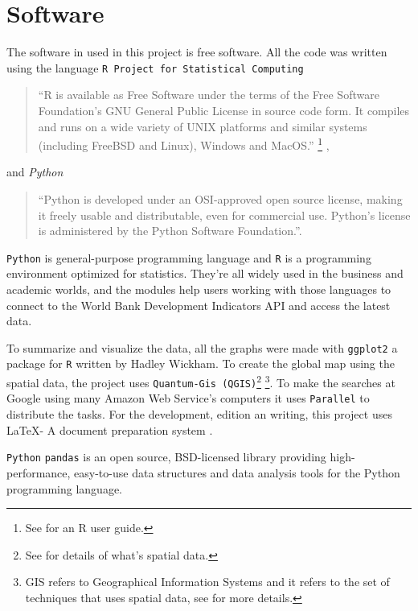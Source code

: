 \chapter{Software}
\label{chap_software}


\noindent The software in used in this project is free software. All the code was written using the  language \texttt{R Project for Statistical Computing}\begin{quote}``R is available as Free Software under the terms of the Free Software Foundation's GNU General Public License in source code form. It compiles and runs on a wide variety of UNIX platforms and similar systems (including FreeBSD and Linux), Windows and MacOS.'' \footnote{See \cite{R:Bloomfield:2014} for an R user guide.} \cite{r_pagina},\end{quote}
and \textit{Python}
\begin{quote}``Python is developed under an OSI-approved open source license, making it freely usable and distributable, even for commercial use. Python's license is administered by the Python Software Foundation.''\cite{python_about}.\end{quote}

\texttt{Python} is general-purpose programming language and \texttt{R} is  a programming environment optimized for statistics. They're all widely used in the business and academic worlds, and the modules help users working with those languages to connect to the World Bank Development Indicators API and access the latest data.

To summarize and visualize the data, all the graphs were made with \texttt{ggplot2} \parencite{wickham_ggplot} a package for \texttt{R} written by Hadley Wickham. To create the global map using the spatial data, the project uses \texttt{Quantum-Gis (QGIS)}\footnote{See \cite{clifford1981} for details of what's spatial data.} \footnote{GIS refers to Geographical Information Systems and it refers to the set of techniques that uses spatial data, see \cite{GIS05}  for more details.}. To make the searches at Google using many Amazon Web Service's computers it uses \texttt{Parallel} \parencite{Tange2011a} to distribute the tasks. For the development, edition an writing, this project uses \LaTeX - A document preparation system \cite{latex}.

\texttt{Python} \texttt{pandas} is an open source, BSD-licensed library providing high-performance, easy-to-use data structures and data analysis tools for the Python programming language.


